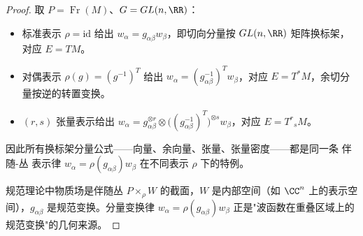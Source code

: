 \begin{proof}
取 $P=\operatorname{Fr}(M)$、$G=GL(n,\RR)$：
\begin{itemize}
\item 标准表示 $\rho=\mathrm{id}$ 给出 $w_\alpha=g_{\alpha\beta}w_\beta$，即切向分量按 $GL(n,\RR)$ 矩阵换标架，对应 $E=TM$。
\item 对偶表示 $\rho(g)=(g^{-1})^T$ 给出 $w_\alpha=(g_{\alpha\beta}^{-1})^T w_\beta$，对应 $E=T^*M$，余切分量按逆的转置变换。
\item $(r,s)$ 张量表示给出 $w_\alpha=g_{\alpha\beta}^{\otimes r}\otimes\bigl((g_{\alpha\beta}^{-1})^T\bigr)^{\otimes s}w_\beta$，对应 $E=T^r{}_sM$。
\end{itemize}
因此所有换标架分量公式——向量、余向量、张量、张量密度——都是同一条 伴随-丛 表示律 $w_\alpha=\rho(g_{\alpha\beta})w_\beta$ 在不同表示 $\rho$ 下的特例。

规范理论中物质场是伴随丛 $P\times_\rho W$ 的截面，$W$ 是内部空间（如 $\CC^n$ 上的表示空间），$g_{\alpha\beta}$ 是规范变换。分量变换律 $w_\alpha=\rho(g_{\alpha\beta})w_\beta$ 正是"波函数在重叠区域上的规范变换"的几何来源。
\end{proof}

